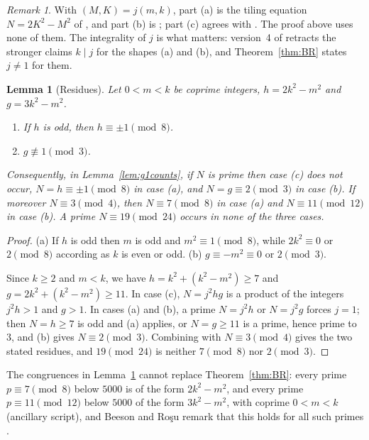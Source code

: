 \documentclass[11pt]{amsart}
\newtheorem{lemma}[theorem]{Lemma}
\theoremstyle{remark}
\newtheorem{remark}[theorem]{Remark}
\begin{document}
\begin{remark}
With $(M,K)=j(m,k)$, part (a) is the tiling equation $N=2K^2-M^2$ of \cite[Theorem~10 and Corollary~1]{Beeson2229}, and part (b) is \cite[Theorem~19]{Beeson2229}; part (c) agrees with \cite[Theorem~15]{Beeson2229}. The proof above uses none of them. The integrality of $j$ is what matters: version~4 of \cite{Beeson2229} retracts the stronger claims $k\mid j$ for the shapes (a) and (b), and Theorem~\ref{thm:BR} states $j\ne1$ for them.
\end{remark}

\begin{lemma}[Residues]\label{lem:g1residues}
Let $0<m<k$ be coprime integers, $h=2k^2-m^2$ and $g=3k^2-m^2$.
\begin{enumerate}
\item[(a)] If $h$ is odd, then $h\equiv\pm1\pmod 8$.
\item[(b)] $g\not\equiv1\pmod3$.
\end{enumerate}
Consequently, in Lemma~\ref{lem:g1counts}, if $N$ is prime then case (c) does not occur, $N=h\equiv\pm1\pmod8$ in case (a), and $N=g\equiv2\pmod3$ in case (b). If moreover $N\equiv3\pmod4$, then $N\equiv7\pmod8$ in case (a) and $N\equiv11\pmod{12}$ in case (b). A prime $N\equiv19\pmod{24}$ occurs in none of the three cases.
\end{lemma}

\begin{proof}
(a) If $h$ is odd then $m$ is odd and $m^2\equiv1\pmod8$, while $2k^2\equiv0$ or $2\pmod8$ according as $k$ is even or odd. (b) $g\equiv-m^2\equiv0$ or $2\pmod3$.

Since $k\ge2$ and $m<k$, we have $h=k^2+(k^2-m^2)\ge7$ and $g=2k^2+(k^2-m^2)\ge11$. In case (c), $N=j^2hg$ is a product of the integers $j^2h>1$ and $g>1$. In cases (a) and (b), a prime $N=j^2h$ or $N=j^2g$ forces $j=1$; then $N=h\ge7$ is odd and (a) applies, or $N=g\ge11$ is a prime, hence prime to $3$, and (b) gives $N\equiv2\pmod 3$. Combining with $N\equiv3\pmod4$ gives the two stated residues, and $19\pmod{24}$ is neither $7\pmod 8$ nor $2\pmod3$.
\end{proof}

The congruences in Lemma~\ref{lem:g1residues} cannot replace Theorem~\ref{thm:BR}: every prime $p\equiv7\pmod8$ below $5000$ is of the form $2k^2-m^2$, and every prime $p\equiv11\pmod{12}$ below $5000$ of the form $3k^2-m^2$, with coprime $0<m<k$ (ancillary script), and Beeson and Ro\c{s}u remark that this holds for all such primes \cite[Sections~12 and~13]{BR}.
\end{document}
